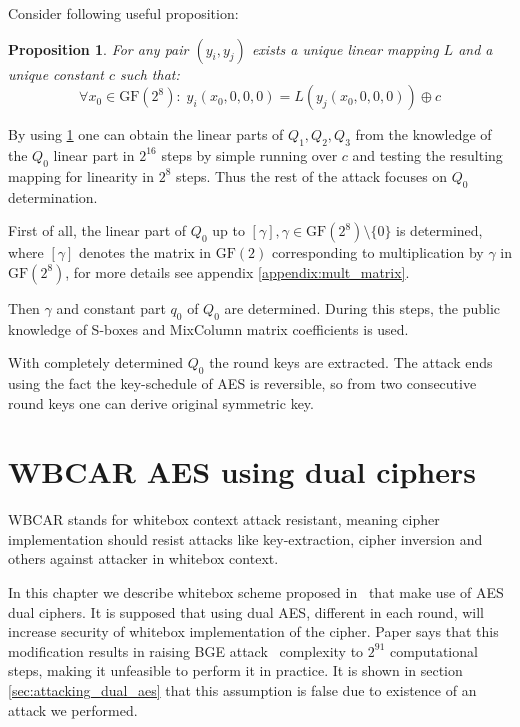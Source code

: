 \documentclass[11pt,oneside,final]{fithesis2}
\newtheorem{myprop}{Proposition}
\newcommand{\gfe}{\ensuremath{\text{GF}\left(2^8\right)}}
\newcommand{\gf}{\ensuremath{\text{GF}\left(2\right)}}
\begin{document}
    Consider following useful proposition:
    \begin{myprop}\label{prop:bge_prop1}
     For any pair $\left(y_i, y_j\right)$ exists a unique linear mapping $L$ and a unique constant $c$ such that:
     \begin{equation}
	\forall x_0 \in \gfe:\; y_i\left(x_0, 0, 0, 0\right) = L \left(y_j \left(x_0, 0, 0, 0 \right) \right) \oplus c
     \end{equation}
    \end{myprop}
    
    By using \ref{prop:bge_prop1} one can obtain the linear parts of $Q_1, Q_2, Q_3$ from the knowledge of the $Q_0$ linear part in $2^{16}$ steps by simple
    running over $c$ and testing the resulting mapping for linearity in $2^8$ steps. Thus the rest of the attack focuses on $Q_0$ determination.
    
    First of all, the linear part of $Q_0$ up to $\left[\gamma\right], \gamma \in \gfe \setminus \{0\}$ is determined, where $\left[\gamma\right]$ denotes the
    matrix in $\gf$ corresponding to multiplication by $\gamma$ in $\gfe$, for more details see appendix \ref{appendix:mult_matrix}.
    
    Then $\gamma$ and constant part $q_0$ of $Q_0$ are determined. During this steps, the public knowledge of S-boxes and MixColumn matrix coefficients is used.
    
    With completely determined $Q_0$ the round keys are extracted.
    The attack ends using the fact the key-schedule of AES is reversible, so from two consecutive round keys one can derive original symmetric key.
    
\chapter{WBCAR AES using dual ciphers}\label{sec:wb_dual_aes_sec}
    WBCAR stands for whitebox context attack resistant, meaning cipher implementation should resist attacks like key-extraction, cipher inversion
    and others against attacker in whitebox context.
    
    In this chapter we describe whitebox scheme proposed in~\citep{Karroumi:2010:PWA:2041036.2041060} that make use of AES dual ciphers. It is supposed 
    that using dual AES, different in each round, will increase security of whitebox implementation of the cipher. Paper says that this modification
    results in raising BGE attack~\citep{Billet:2004:CWB:2080787.2080809} complexity to $2^{91}$ computational steps, making it unfeasible to perform it in practice. It is shown in section
    \ref{sec:attacking_dual_aes} that this assumption is false due to existence of an attack we performed.
    
\end{document}
